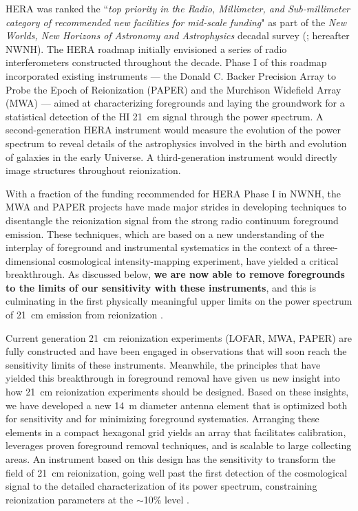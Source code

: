 \documentclass[preprint]{aastex}
\begin{document}
HERA was ranked the ``{\it top priority in the Radio, Millimeter, and
Sub-millimeter category of recommended new facilities for mid-scale
funding}" as part of the {\it New Worlds, New Horizons of Astronomy
and Astrophysics} decadal survey (\citealt{astro2010}; hereafter
NWNH).  The HERA roadmap initially envisioned a series of radio
interferometers constructed throughout the decade. Phase I of this roadmap
incorporated existing instruments --- the Donald C. Backer Precision Array to Probe the Epoch of
Reionization (PAPER) and the Murchison Widefield Array (MWA) ---
aimed at characterizing foregrounds and laying the
groundwork for a statistical detection of the HI 21~cm signal through
the power spectrum.  A second-generation HERA instrument would measure
the evolution of the power spectrum to reveal details of the astrophysics
involved in the birth and evolution of galaxies 
in the early Universe. A third-generation instrument would
directly image structures throughout reionization.

With a fraction of the funding recommended for HERA Phase I
in NWNH, the MWA and PAPER projects have made
major strides in developing techniques to disentangle
the reionization signal from the strong radio continuum foreground
emission.  These techniques, which are based on a new
understanding of the interplay of foreground and instrumental systematics
in the context of a three-dimensional cosmological intensity-mapping experiment,
have yielded a critical breakthrough.  As discussed below, {\bf we are now able to remove 
foregrounds to the limits of our sensitivity with these instruments},
and this is culminating in the first physically meaningful upper limits
on the power spectrum of 21~cm emission from reionization \citep{parsons_et_al2013}.

Current generation 21~cm reionization experiments (LOFAR, MWA, PAPER) are fully constructed and have been engaged in observations
that will soon reach the sensitivity limits of these instruments.  Meanwhile,
the principles that have yielded this breakthrough in foreground removal
have given us new insight into how
21~cm reionization experiments should be designed.  Based on these insights, we have developed a new 14~m diameter antenna element 
that is optimized both for
sensitivity and for minimizing foreground systematics.  
Arranging these elements in a compact hexagonal grid yields an array that
facilitates calibration, leverages proven foreground removal techniques, and is scalable
to large collecting areas.
An instrument based on this design has the sensitivity to transform the field of 21~cm reionization,
going well past the first detection of the cosmological signal to the detailed characterization of 
its power spectrum, constraining reionization parameters at the $\sim$10\% level \citep{pober_et_al2014}.
\end{document}
